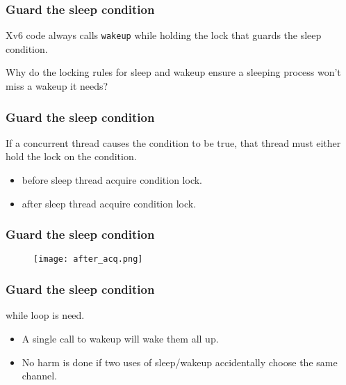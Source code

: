 \documentclass{beamer}
\begin{document}
\begin{frame}[t]
  \frametitle{Guard the sleep condition}

  Xv6 code always calls \texttt{wakeup} while holding the lock that guards
  the sleep condition.

  \begin{center}
    Why do the locking rules for sleep and wakeup ensure a sleeping process won’t miss
    a wakeup it needs?
  \end{center}
  
\end{frame}


\begin{frame}[t]
  \frametitle{Guard the sleep condition}

  If a concurrent thread causes the condition to be true, that thread
  must either hold the lock on the condition.

  \begin{itemize}
  \item before sleep thread acquire condition lock.
  \item after sleep thread acquire condition lock.
  \end{itemize}

  
\end{frame}


\begin{frame}[t]
  \frametitle{Guard the sleep condition}

  \begin{figure}[ht]
    \centering
    \texttt{[image: after\_acq.png]}
  \end{figure}


\end{frame}


\begin{frame}[t]
  \frametitle{Guard the sleep condition}

  \begin{center}
    while loop is need.
  \end{center}

  \begin{itemize}
  \item A single call to wakeup will wake them all up.
  \item No harm is done if two uses of sleep/wakeup accidentally choose the same channel.
  \end{itemize}
  
\end{frame}
\end{document}
